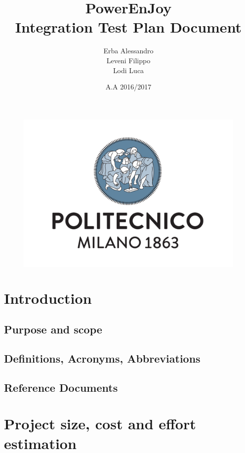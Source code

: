 \documentclass[english]{article}
\begin{document}
	\begin{figure}
		\centering
		\includegraphics[scale=0.5]{Images/logo.pdf} 
	\end{figure}


	\title{PowerEnJoy\\
	Integration Test Plan Document\\
	}

	\date{A.A 2016/2017}
	
	\author{Erba Alessandro\\
	 Leveni Filippo\\
	 Lodi Luca}
	
	\maketitle
	\pagebreak{}
	\tableofcontents{} 
	\pagebreak{}
\section{Introduction}
\subsection{Purpose and scope}
\subsection{Definitions, Acronyms, Abbreviations}
\subsection{Reference Documents}
\section{Project size, cost and effort estimation}
\end{document}
